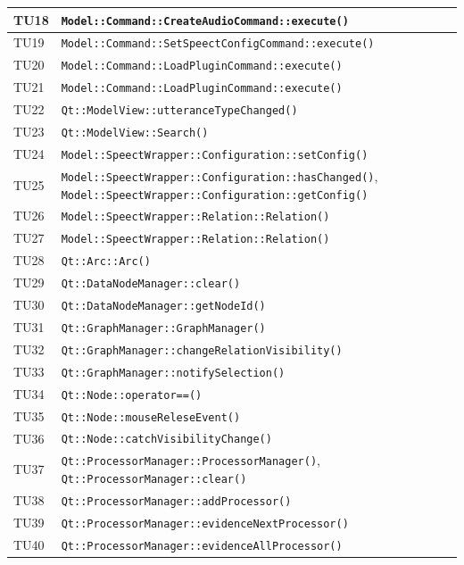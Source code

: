 \documentclass[openany,12pt,a4paper]{report}
\begin{document}
\begin{longtable}[c]{| p{2.5cm} |p{11cm}|}
	\hline
	TU18&
	\verb|Model::Command::CreateAudioCommand::execute()|
	\\[1em]
	\hline
	TU19&
	\verb|Model::Command::SetSpeectConfigCommand::execute()|
	\\[1em]
	\hline
	TU20&
	\verb|Model::Command::LoadPluginCommand::execute()|
	\\[1em]
	\hline
	TU21&
	\verb|Model::Command::LoadPluginCommand::execute()|
	\\[1em]
	\hline
	TU22&
	\verb|Qt::ModelView::utteranceTypeChanged()|
	\\[1em]
	\hline
	TU23&
	\verb|Qt::ModelView::Search()|
	\\[1em]
	\hline
	TU24&
	\verb|Model::SpeectWrapper::Configuration::setConfig()|
	\\[1em]
	\hline
	TU25&
	\verb|Model::SpeectWrapper::Configuration::hasChanged()|,
	\verb|Model::SpeectWrapper::Configuration::getConfig()|
	\\[1em]
	\hline
	TU26&
	\verb|Model::SpeectWrapper::Relation::Relation()|
	\\[1em]
	\hline
	TU27&
	\verb|Model::SpeectWrapper::Relation::Relation()|
	\\[1em]
	\hline
	TU28&
	\verb|Qt::Arc::Arc()|
	\\[1em]
	\hline
	TU29&
	\verb|Qt::DataNodeManager::clear()|
	\\[1em]
	\hline
	TU30&
	\verb|Qt::DataNodeManager::getNodeId()|
	\\[1em]
	\hline
	TU31&
	\verb|Qt::GraphManager::GraphManager()|
	\\[1em]
	\hline
	TU32&
	\verb|Qt::GraphManager::changeRelationVisibility()|
	\\[1em]
	\hline
	TU33&
	\verb|Qt::GraphManager::notifySelection()|
	\\[1em]
	\hline
	TU34&
	\verb|Qt::Node::operator==()|
	\\[1em]
	\hline
	TU35&
	\verb|Qt::Node::mouseReleseEvent()|
	\\[1em]
	\hline
	TU36&
	\verb|Qt::Node::catchVisibilityChange()|
	\\[1em]
	\hline
	TU37&
	\verb|Qt::ProcessorManager::ProcessorManager()|,
	\verb|Qt::ProcessorManager::clear()|
	\\[1em]
	\hline
	TU38&
	\verb|Qt::ProcessorManager::addProcessor()|
	\\[1em]
	\hline
	TU39&
	\verb|Qt::ProcessorManager::evidenceNextProcessor()|
	\\[1em]
	\hline
	TU40&
	\verb|Qt::ProcessorManager::evidenceAllProcessor()|
	\\[1em]
	\hline
\end{longtable}
\end{document}
